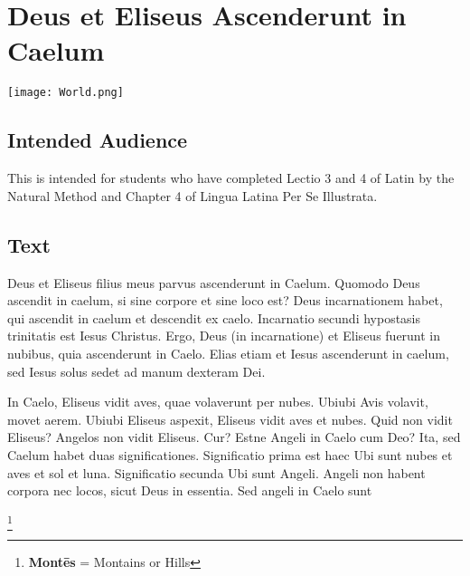 \chapter{Deus et Eliseus Ascenderunt in Caelum}
\begin{center}
\texttt{[image: World.png]}
\end{center}

\section{Intended Audience}
This is intended for students who have completed Lectio 3 and 4 of Latin by the Natural Method and Chapter 4 of Lingua Latina Per Se Illustrata. 

\section{Text}
Deus et Eliseus filius meus parvus ascenderunt in Caelum. Quomodo Deus ascendit in caelum, si sine corpore et sine loco est? Deus incarnationem habet, qui ascendit in caelum et descendit ex caelo. Incarnatio secundi hypostasis trinitatis est Iesus Christus. Ergo, Deus (in incarnatione) et Eliseus fuerunt in nubibus, quia ascenderunt in Caelo. Elias etiam et Iesus ascenderunt in caelum, sed Iesus solus sedet ad manum dexteram Dei. 

In Caelo, Eliseus vidit aves, quae volaverunt per nubes. Ubiubi Avis volavit, movet aerem. Ubiubi Eliseus aspexit, Eliseus vidit aves et nubes. Quid non vidit Eliseus? Angelos non vidit Eliseus. Cur? Estne Angeli in Caelo cum Deo? Ita, sed Caelum habet duas significationes. Significatio prima est haec \: Ubi sunt nubes et aves et sol et luna. Significatio secunda \: Ubi sunt Angeli. Angeli non habent corpora nec locos, sicut Deus in essentia. Sed angeli in Caelo sunt


\footnote{\textbf{Montēs} = Montains or Hills}